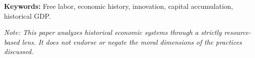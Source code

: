 \documentclass[12pt]{article}
\begin{document}
\noindent \textbf{Keywords:} Free labor, economic history, innovation, capital accumulation, historical GDP.

\vspace{1em}
\noindent \emph{Note: This paper analyzes historical economic systems through a strictly resource-based lens. It does not endorse or negate the moral dimensions of the practices discussed.}
\end{document}
